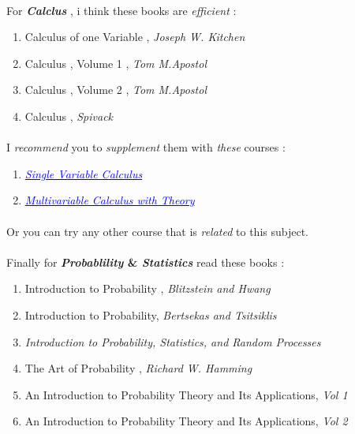 \documentclass[12pt, a4paper]{article}
\begin{document}
\paragraph{}
For \textbf{\emph{Calclus}} , i think these books are \emph{efficient} :
\begin{enumerate}
	\item Calculus of one Variable ,  \emph{\large{Joseph W. Kitchen}}
	\item Calculus , Volume 1 , \emph{\large{Tom M.Apostol}}
	\item Calculus , Volume 2 , \emph{\large{Tom M.Apostol}}
	\item Calculus , \emph{\large{Spivack}}
\end{enumerate}
\paragraph{}
I \emph{recommend} you to \emph{supplement} them with \emph{these} courses :

\begin{enumerate}
	\item \href{https://ocw.mit.edu/courses/mathematics/18-014-calculus-with-theory-fall-2010/}{\emph{\textcolor{blue}{Single Variable Calculus}}}
	\item \href{https://ocw.mit.edu/courses/mathematics/18-024-multivariable-calculus-with-theory-spring-2011/}{\emph{\textcolor{blue}{Multivariable Calculus with Theory}}}
\end{enumerate}
\paragraph{}
Or you can try any other course that is \emph{related} to this subject.

\newpage
\paragraph{}
Finally for \textbf{\emph{Probablility} \& \emph{Statistics}} read these books :
\begin{enumerate}
	\item Introduction to Probability , \emph{\large{Blitzstein and Hwang}}
	\item Introduction to Probability, \emph{\large{Bertsekas  and Tsitsiklis}}
	\item \emph{Introduction to Probability, Statistics, and Random Processes\\}
	\item The Art of Probability , \emph{\large{Richard W. Hamming}}
	
	 \item An Introduction to Probability Theory and Its Applications, \emph{\large{Vol 1}}
	 \item An Introduction to Probability Theory and Its Applications, \emph{\large{Vol 2}}
\end{enumerate}
\end{document}
